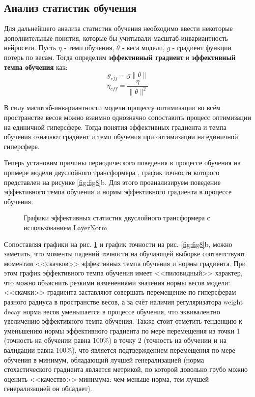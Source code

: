 \documentclass{article}
\begin{document}
\subsection{Анализ статистик обучения}
Для дальнейшего анализа статистик обучения необходимо ввести некоторые дополнительные понятия, которые бы учитывали масштаб-инвариантность нейросети. Пусть $\eta$ - темп обучения, $\theta$ - веса модели, $g$ - градиент функции потерь по весам. Тогда определим \textbf{эффективный градиент} и \textbf{эффективный темпа обучения} как:
$$g_{eff} = g \|\theta\|$$
$$\eta_{eff} = \frac{\eta}{\|\theta\|^2}$$
\par В силу масштаб-инвариантности модели процессу оптимизации во всём пространстве весов можно взаимно однозначно сопоставить процесс оптимизации на единичной гиперсфере. Тогда понятия эффективных градиента и темпа обучения означают градиент и темп обучения при оптимизации на единичной гиперсфере.
\par Теперь установим причины периодического поведения в процессе обучения на примере модели двуслойного трансформера , график точности которого представлен на рисунке \ref{fig:fig8}b. Для этого проанализируем поведение эффективного темпа обучения и нормы эффективного градиента в процессе обучения.
\begin{figure}[h]
\centering
{}
\caption{Графики эффективных статистик двуслойного трансформера с использованием LayerNorm}
\label{fig:fig9}
\end{figure}
\par Сопоставляя графики на рис. \ref{fig:fig9} и график точности на рис. \ref{fig:fig8}b, можно заметить, что моменты падений точности на обучающей выборке соответствуют моментам <<скачков>> эффективных темпа обучения и нормы градиента. При этом график эффективного темпа обучения имеет <<пиловидный>> характер, что можно объяснить резкими изменениями значения нормы весов модели: <<скачки>> градиента заставляют совершать перемещение по гиперсферам разного радиуса в пространстве весов, а за счёт наличия регуляризатора weight decay норма весов уменьшается в процессе обучения, что эквивалентно увеличению эффективного темпа обучения. Также стоит отметить тенденцию к уменьшению нормы эффективного градиента по мере перемещения из точки 1 (точность на обучении равна 100\%) в точку 2 (точность на обучении и на валидации равна 100\%), что является подтверждением перемещения по мере обучения в минимум, обладающий лучшей генерализацией (норма стохастического градиента является метрикой, по которой довольно грубо можно оценить <<качество>> минимума: чем меньше норма, тем лучшей генерализацией он обладает).


\end{document}
